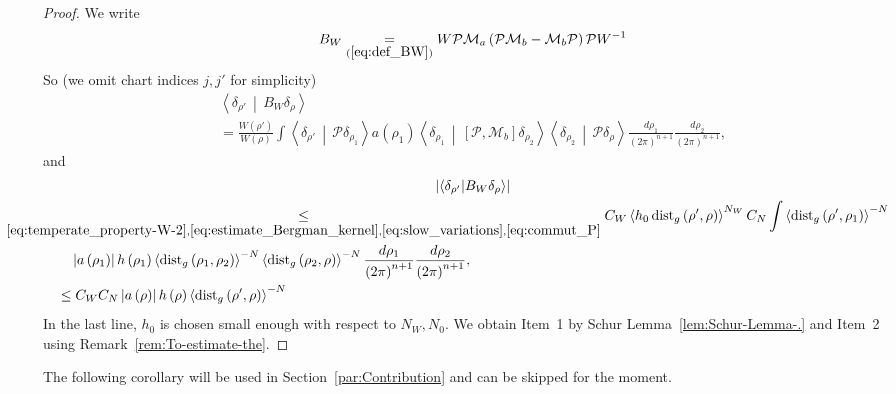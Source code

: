 \documentclass[AHL,Unicode,longabstracts,published]{cedram}
\newcommand*\eq[1]{\underset{(#1)}{=}}
\newcommand{\clM}{\mathcal{M}}
\newcommand{\clP}{\mathcal{P}}
\newcommand{\dist}{\mathrm{dist}}
\begin{document}
\begin{proof}
We write
\[
B_{W}\eq{\ref{eq:def_BW}}W\clP \clM_{a}\left(\clP \clM_{b}-\clM_{b}\clP \right)\clP W^{-1}
\]
So (we omit chart indices $j,j'$ for simplicity)
\begin{multline*}
\left\langle\delta_{\rho'}\,\middle|\,B_{W}\delta_{\rho}\right\rangle\\ =\frac{W\left(\rho'\right)}{W\left(\rho\right)}\int\left\langle\delta_{\rho'}\,\middle|\,\clP \delta_{\rho_{1}}\right\rangle a\left(\rho_{1}\right)\left\langle\delta_{\rho_{1}}\,\middle|\,\left[\clP ,\clM_{b}\right]\delta_{\rho_{2}}\right\rangle \left\langle\delta_{\rho_{2}}\,\middle|\,\clP \delta_{\rho}\right\rangle\frac{d\rho_{1}}{\left(2\pi\right)^{n+1}}\frac{d\rho_{2}}{\left(2\pi\right)^{n+1}},
\end{multline*}
and
\begin{multline*}
\left|\langle\delta_{\rho'}|B_{W}\delta_{\rho}\rangle\right|\\
\begin{aligned}
&\mkern-70mu\underset{\eqref{eq:temperate_property-W-2},\eqref{eq:estimate_Bergman_kernel},\eqref{eq:slow_variations},\eqref{eq:commut_P}}{\leq}  C_{W}\left\langle h_{0}\,\dist_{g}\left(\rho',\rho\right)\right\rangle ^{N_{W}}C_{N}\int\left\langle \dist_{g}\left(\rho',\rho_{1}\right)\right\rangle ^{-N}\\
& \quad\left|a\left(\rho_{1}\right)\right|h\left(\rho_{1}\right)\left\langle \dist_{g}\left(\rho_{1},\rho_{2}\right)\right\rangle ^{-N}\left\langle \dist_{g}\left(\rho_{2},\rho\right)\right\rangle ^{-N}\frac{d\rho_{1}}{\left(2\pi\right)^{n+1}}\frac{d\rho_{2}}{\left(2\pi\right)^{n+1}},\\
&\leq C_{W}C_{N}\left|a\left(\rho\right)\right|h\left(\rho\right)\left\langle \dist_{g}\left(\rho',\rho\right)\right\rangle ^{-N}
\end{aligned}
\end{multline*}
In the last line, $h_{0}$ is chosen small enough with respect to $N_{W},N_{0}$. We obtain Item~1 by Schur Lemma~\ref{lem:Schur-Lemma-.} and Item~2 using Remark~\ref{rem:To-estimate-the}.
\end{proof}

The following corollary will be used in Section~\ref{par:Contribution} and can be skipped for the moment.
\end{document}
